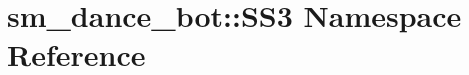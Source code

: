 \hypertarget{namespacesm__dance__bot_1_1SS3}{}\section{sm\+\_\+dance\+\_\+bot\+:\+:S\+S3 Namespace Reference}
\label{namespacesm__dance__bot_1_1SS3}
